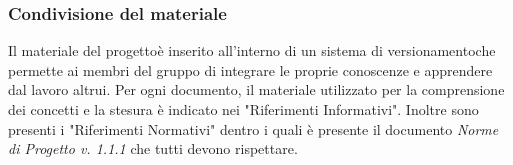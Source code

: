 		\subsubsection{Condivisione del materiale}
			Il materiale del progetto\glosp è inserito all'interno di un sistema di versionamento\glosp che permette ai membri del gruppo di integrare le proprie conoscenze e apprendere dal lavoro altrui.
			Per ogni documento, il materiale utilizzato per la comprensione dei concetti e la stesura è indicato nei "Riferimenti Informativi".
			Inoltre sono presenti i "Riferimenti Normativi" dentro i quali è presente il documento \textit{Norme di Progetto v. 1.1.1} che tutti devono rispettare.
